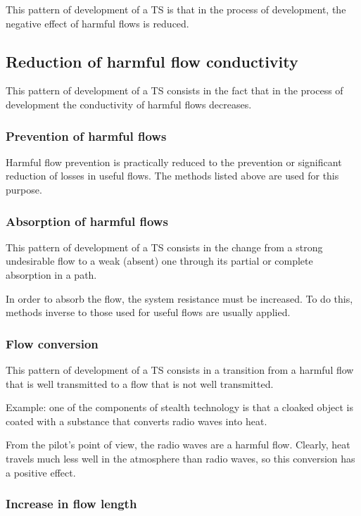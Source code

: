 \documentclass[a4paper,11pt]{article}
\begin{document}
This pattern of development of a TS is that in the process of development, the
negative effect of harmful flows is reduced.

\subsection{Reduction of harmful flow conductivity}

This pattern of development of a TS consists in the fact that in the process
of development the conductivity of harmful flows decreases.

\subsubsection{Prevention of harmful flows}

Harmful flow prevention is practically reduced to the prevention or
significant reduction of losses in useful flows. The methods listed above are
used for this purpose.

\subsubsection{Absorption of harmful flows}

This pattern of development of a TS consists in the change from a strong
undesirable flow to a weak (absent) one through its partial or complete
absorption in a path.

In order to absorb the flow, the system resistance must be increased. To do
this, methods inverse to those used for useful flows are usually applied.

\subsubsection{Flow conversion}

This pattern of development of a TS consists in a transition from a harmful
flow that is well transmitted to a flow that is not well transmitted.

Example: one of the components of stealth technology is that a cloaked object
is coated with a substance that converts radio waves into heat.

From the pilot's point of view, the radio waves are a harmful flow. Clearly,
heat travels much less well in the atmosphere than radio waves, so this
conversion has a positive effect.

\subsubsection{Increase in flow length}
\end{document}
